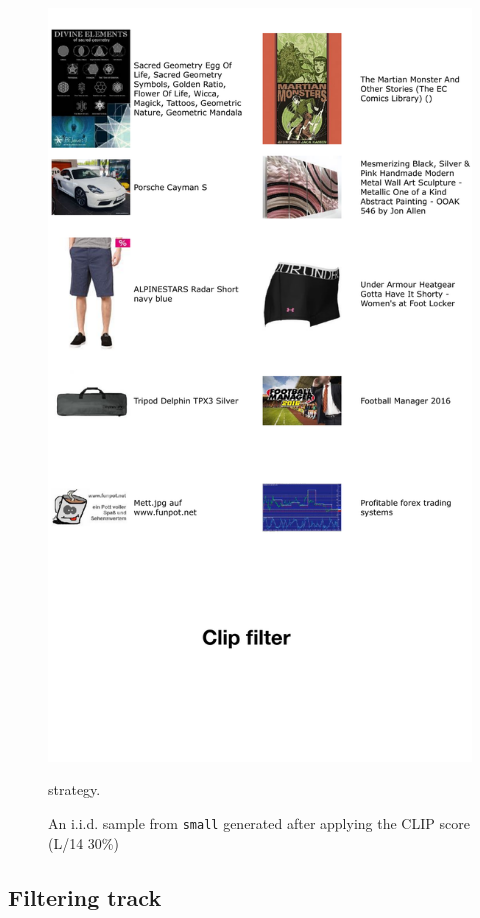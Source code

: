 \begin{figure}
    \centering
    \includegraphics[width=0.9\linewidth]{figures/appx-clip_filter.pdf}
    \caption{An i.i.d. sample from {\small \texttt{small}} \pool generated after applying the CLIP score (L/14 30\%)} strategy.
    \label{fig:clip_filter}
\end{figure}


\FloatBarrier

\subsection{Filtering track}\label{sec:app-baselines-pool}

